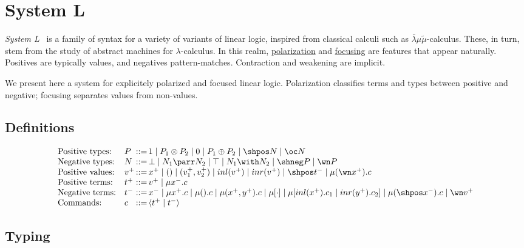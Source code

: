 \chapter{System L}\label{system-l}

\emph{System L}~\cite{dualitycomputationfocus} is a family of syntax for a variety of variants of
linear logic, inspired from classical calculi such as
\(\bar\lambda\mu\tilde\mu\)-calculus. These, in turn, stem from the
study of abstract machines for \(\lambda\)-calculus. In this realm,
\hyperref[polarized-linear-logic]{polarization} and \hyperref[reversibility-and-focusing]{focusing} are
features that appear naturally. Positives are typically values, and
negatives pattern-matches. Contraction and weakening are implicit.

We present here a system for explicitely polarized and focused linear
logic. Polarization classifies terms and types between positive and
negative; focusing separates values from non-values.

\section{Definitions}\label{definitions}

\begin{equation*}
\begin{array}{ll@{\,}l@{\,}l}
\text{Positive types:} & P & ::= & 1 \mid P_1 \otimes P_2 \mid 0 \mid P_1 \oplus P_2 \mid \shpos N \mid \oc N \\
\text{Negative types:} & N & ::= & \bot \mid N_1 \parr N_2 \mid \top \mid N_1 \with N_2 \mid \shneg P \mid \wn P \\
\text{Positive values:} & v^+ & ::= & x^+ \mid () \mid (v_1^+, v_2^+) \mid inl(v^+) \mid inr(v^+) \mid \shpos t^- \mid \mu(\wn x^+).c \\
\text{Positive terms:} & t^+ & ::= & v^+ \mid \mu x^-.c \\
\text{Negative terms:} & t^- & ::= & x^- \mid \mu x^+.c \mid \mu().c \mid \mu(x^+, y^+).c \mid \mu [\cdot] \mid \mu[inl(x^+).c_1 \mid inr(y^+).c_2] \mid \mu(\shpos x^-).c \mid \wn v^+ \\
\text{Commands:} & c & ::= & \langle t^+ \mid t^- \rangle
\end{array}
\end{equation*}
\section{Typing}\label{typing}

